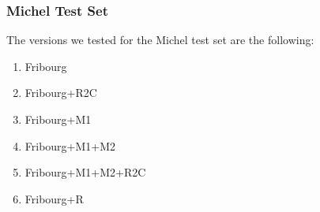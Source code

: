 



\subsubsection{Michel Test Set}
The versions we tested for the Michel test set are the following:
\begin{enumerate}
\item Fribourg
\item Fribourg+R2C
\item Fribourg+M1
\item Fribourg+M1+M2
\item Fribourg+M1+M2+R2C
\item Fribourg+R
\end{enumerate}


